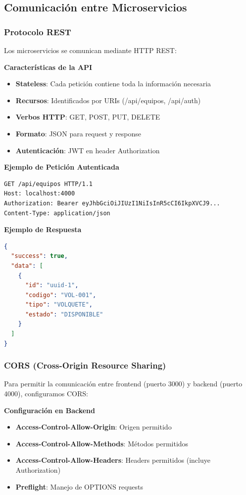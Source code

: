 \documentclass[12pt,a4paper]{article}
\begin{document}
\subsection{Comunicación entre Microservicios}

\subsubsection{Protocolo REST}

Los microservicios se comunican mediante HTTP REST:

\textbf{Características de la API}
\begin{itemize}
    \item \textbf{Stateless}: Cada petición contiene toda la información necesaria
    \item \textbf{Recursos}: Identificados por URIs (/api/equipos, /api/auth)
    \item \textbf{Verbos HTTP}: GET, POST, PUT, DELETE
    \item \textbf{Formato}: JSON para request y response
    \item \textbf{Autenticación}: JWT en header Authorization
\end{itemize}

\textbf{Ejemplo de Petición Autenticada}

\begin{lstlisting}[language=bash, caption=Petición GET con JWT]
GET /api/equipos HTTP/1.1
Host: localhost:4000
Authorization: Bearer eyJhbGciOiJIUzI1NiIsInR5cCI6IkpXVCJ9...
Content-Type: application/json
\end{lstlisting}

\textbf{Ejemplo de Respuesta}

\begin{lstlisting}[language=json, caption=Respuesta JSON del backend]
{
  "success": true,
  "data": [
    {
      "id": "uuid-1",
      "codigo": "VOL-001",
      "tipo": "VOLQUETE",
      "estado": "DISPONIBLE"
    }
  ]
}
\end{lstlisting}

\subsubsection{CORS (Cross-Origin Resource Sharing)}

Para permitir la comunicación entre frontend (puerto 3000) y backend (puerto 4000), configuramos CORS:

\textbf{Configuración en Backend}
\begin{itemize}
    \item \textbf{Access-Control-Allow-Origin}: Origen permitido
    \item \textbf{Access-Control-Allow-Methods}: Métodos permitidos
    \item \textbf{Access-Control-Allow-Headers}: Headers permitidos (incluye Authorization)
    \item \textbf{Preflight}: Manejo de OPTIONS requests
\end{itemize}
\end{document}
